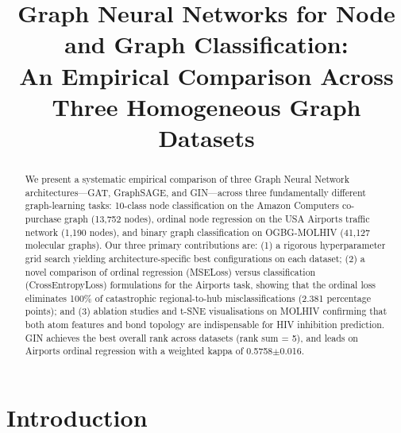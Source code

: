 \documentclass[conference]{IEEEtran}
\begin{document}
\title{Graph Neural Networks for Node and Graph Classification:\\
An Empirical Comparison Across Three Homogeneous Graph Datasets}

\author{
}

\maketitle

\begin{abstract}
We present a systematic empirical comparison of three Graph Neural Network architectures---GAT, GraphSAGE, and GIN---across three fundamentally different graph-learning tasks: 10-class node classification on the Amazon Computers co-purchase graph (13,752 nodes), ordinal node regression on the USA Airports traffic network (1,190 nodes), and binary graph classification on OGBG-MOLHIV (41,127 molecular graphs). Our three primary contributions are: (1) a rigorous hyperparameter grid search yielding architecture-specific best configurations on each dataset; (2) a novel comparison of ordinal regression (MSELoss) versus classification (CrossEntropyLoss) formulations for the Airports task, showing that the ordinal loss eliminates 100\% of catastrophic regional-to-hub misclassifications (2.381 percentage points); and (3) ablation studies and t-SNE visualisations on MOLHIV confirming that both atom features and bond topology are indispensable for HIV inhibition prediction. GIN achieves the best overall rank across datasets (rank sum = 5), and leads on Airports ordinal regression with a weighted kappa of 0.5758$\pm$0.016.
\end{abstract}

\section{Introduction}
\end{document}
